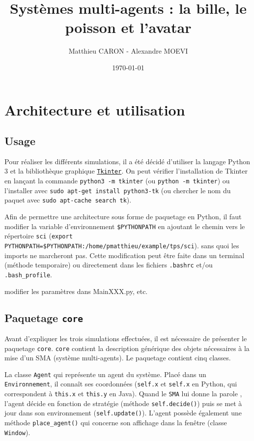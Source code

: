 \documentclass[a4paper]{article}
\title{Systèmes multi-agents : la bille, le poisson et l'avatar}
\author{Matthieu CARON - Alexandre MOEVI}
\date{\today}
\begin{document}
\maketitle

\section{Architecture et utilisation}

\subsection{Usage}
Pour réaliser les différents simulations, il a été décidé d'utiliser la langage Python 3 et la bibliothèque graphique \href{https://wiki.python.org/moin/TkInter}{\texttt{Tkinter}}. On peut vérifier l'installation de Tkinter en lançant la commande \texttt{python3 -m tkinter} (ou \texttt{python -m tkinter}) ou l'installer avec \texttt{sudo apt-get install python3-tk} (ou chercher le nom du paquet avec \texttt{sudo apt-cache search tk}).

\medskip
Afin de permettre une architecture sous forme de paquetage en Python, il faut modifier la variable d'environnement \texttt{\$PYTHONPATH} en ajoutant le chemin vers le répertoire \texttt{sci} (\texttt{export PYTHONPATH=\$PYTHONPATH:/home/pmatthieu/example/tps/sci}). sans quoi les imports ne marcheront pas. Cette modification peut être faite dans un terminal (méthode temporaire) ou directement dans les fichiers \texttt{.bashrc} et/ou \texttt{.bash\_profile}.

\medskip
modifier les paramètres dans MainXXX.py, etc.

\subsection{Paquetage \texttt{core}}
Avant d'expliquer les trois simulations effectuées, il est nécessaire de présenter le paquetage \texttt{core}. \texttt{core} contient la description générique des objets nécessaires à la mise d'un SMA (système multi-agents). Le paquetage contient cinq classes.
 
\medskip
La classe \texttt{Agent} qui représente un agent du système. Placé dans un \texttt{Environnement}, il connaît ses coordonnées (\texttt{self.x} et \texttt{self.x} en Python, qui correspondent à \texttt{this.x} et \texttt{this.y} en Java). Quand le \texttt{SMA} lui \og donne la parole \fg{}, l'agent décide en fonction de stratégie (méthode \texttt{self.decide()}) puis se met à jour dans son environnement (\texttt{self.update()}). L'agent possède également une méthode \texttt{place\_agent()} qui concerne son affichage dans la fenêtre (classe \texttt{Window}).
\end{document}
